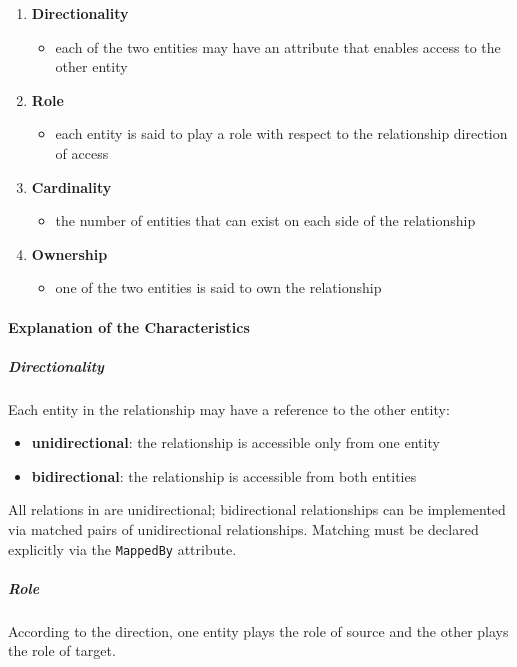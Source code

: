 \documentclass[english]{article}
\begin{document}
\begin{enumerate}
  \item \textbf{Directionality}
        \begin{itemize}[label=\(\rightarrow\)]
          \item each of the two entities may have an attribute that enables access to the other entity
        \end{itemize}
  \item \textbf{Role}
        \begin{itemize}[label=\(\rightarrow\)]
          \item each entity is said to play a role with respect to the relationship direction of access
        \end{itemize}
  \item \textbf{Cardinality}
        \begin{itemize}[label=\(\rightarrow\)]
          \item the number of entities that can exist on each side of the relationship
        \end{itemize}
  \item \textbf{Ownership}
        \begin{itemize}[label=\(\rightarrow\)]
          \item one of the two entities is said to own the relationship
        \end{itemize}
\end{enumerate}

\paragraph{Explanation of the Characteristics}

\subparagraph*{Directionality}
Each entity in the relationship may have a reference to the other entity:

\begin{itemize}
  \item \textbf{unidirectional}: the relationship is accessible only from one entity
  \item \textbf{bidirectional}: the relationship is accessible from both entities
\end{itemize}

All relations in \jpa are unidirectional;
bidirectional relationships can be implemented via matched pairs of unidirectional relationships.
Matching must be declared explicitly via the \texttt{MappedBy} attribute.

\subparagraph*{Role}
According to the direction, one entity plays the role of source and the other plays the role of target.
\end{document}
